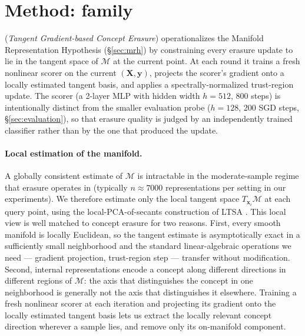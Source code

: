 \section{Method: \TanGCE{} family}
\label{sec:method}

\TanGCE{} (\emph{Tangent Gradient-based Concept Erasure}) operationalizes the Manifold Representation Hypothesis (§\ref{sec:mrh}) by constraining every erasure update to lie in the tangent space of $\mathcal{M}$ at the current point. At each round it trains a fresh nonlinear scorer on the current $(\mathbf{X}, \mathbf{y})$, projects the scorer's gradient onto a locally estimated tangent basis, and applies a spectrally-normalized trust-region update. The scorer (a 2-layer MLP with hidden width $h{=}512$, $800$ steps) is intentionally distinct from the smaller evaluation probe ($h{=}128$, 200 SGD steps, §\ref{sec:evaluation}), so that erasure quality is judged by an independently trained classifier rather than by the one that produced the update.

\paragraph{Local estimation of the manifold.}
A globally consistent estimate of $\mathcal{M}$ is intractable in the moderate-sample regime that erasure operates in (typically $n \approx 7000$ representations per setting in our experiments). We therefore estimate only the local tangent space $T_{\mathbf{x}_i}\mathcal{M}$ at each query point, using the local-PCA-of-secants construction of LTSA \citep{zhang-zha-2004-ltsa}. This local view is well matched to concept erasure for two reasons. First, every smooth manifold is locally Euclidean, so the tangent estimate is asymptotically exact in a sufficiently small neighborhood and the standard linear-algebraic operations we need --- gradient projection, trust-region step --- transfer without modification. Second, internal representations encode a concept along different directions in different regions of $\mathcal{M}$: the axis that distinguishes the concept in one neighborhood is generally not the axis that distinguishes it elsewhere. Training a fresh nonlinear scorer at each iteration and projecting its gradient onto the locally estimated tangent basis lets us extract the locally relevant concept direction wherever a sample lies, and remove only its on-manifold component.

